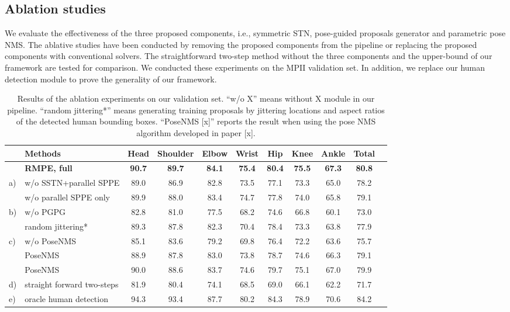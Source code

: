 \documentclass[10pt,twocolumn,letterpaper]{article}
\begin{document}
\subsection{Ablation studies}
We evaluate the effectiveness of the three proposed components, i.e., symmetric STN, pose-guided proposals generator and parametric pose NMS. The ablative studies have been conducted by removing the proposed components from the pipeline or replacing the proposed components with conventional solvers. The straightforward two-step method without the three components and the upper-bound of our framework are tested for comparison. We conducted these experiments on the MPII validation set. In addition, we replace our human detection module to prove the generality of our framework.
\begin{table*}[tbh]
\begin{center}
\begin{tabular}{ll|c c c c c c c c c}
\hline
 &Methods &Head & Shoulder & Elbow & Wrist & Hip & Knee  & Ankle & Total\\
 \hline
& \textbf{RMPE, full}& \textbf{90.7} & \textbf{89.7}  & \textbf{84.1}  & \textbf{75.4}  & \textbf{80.4}  & \textbf{75.5} & \textbf{67.3} & \textbf{80.8}\\ \hline
\multirow{2}{*}{a)} & w/o SSTN+parallel SPPE& 89.0  & 86.9  & 82.8  & 73.5  & 77.1  & 73.3 & 65.0 & 78.2 \\
& w/o parallel SPPE only& 89.9  & 88.0  & 83.4  & 74.7  & 77.8  & 74.0 & 65.8 & 79.1 \\
\multirow{2}{*}{b)} & w/o PGPG&  82.8  & 81.0  & 77.5  & 68.2  & 74.6  & 66.8 & 60.1 & 73.0 \\
& random jittering* &  89.3  & 87.8  & 82.3  & 70.4  & 78.4  & 73.3 & 63.8 & 77.9 \\
\multirow{3}{*}{c)}& w/o PoseNMS& 85.1  & 83.6  & 79.2  & 69.8  & 76.4  & 72.2 & 63.6 & 75.7 \\
& PoseNMS \cite{chen2015parsing}& 88.9  & 87.8  & 83.0  & 73.8  & 78.7  & 74.6 & 66.3 & 79.1\\
& PoseNMS \cite{burgos2013merging}& 90.0  & 88.6  & 83.7  & 74.6  & 79.7  & 75.1 & 67.0 & 79.9\\
d)& straight forward two-steps & 81.9  & 80.4  & 74.1  & 68.5  & 69.0  & 66.1 & 62.2 & 71.7 \\
e)& oracle human detection & 94.3  & 93.4  & 87.7  & 80.2  & 84.3  & 78.9 & 70.6 & 84.2 \\
\end{tabular} \vspace{0.10in}
\caption{Results of the ablation experiments on our validation set. ``w/o X'' means without X module in our pipeline. ``random jittering*'' means generating training proposals by jittering locations and aspect ratios of the detected human bounding boxes. ``PoseNMS [x]'' reports the result when using the pose NMS algorithm developed in paper [x].} \label{tab:Ablation}
\end{center}
\vspace{-0.10in}
\end{table*}
\end{document}
